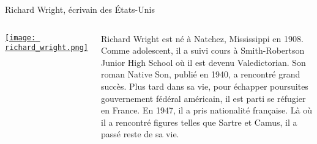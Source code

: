 \begin{frame}{Richard Wright, écrivain des États-Unis}
  \begin{columns}
      \begin{center}
        \href{https://www.ina.fr/ina-eclaire-actu/video/i05133764/richard-wright-a-propos-du-livre-fishbelly}{\texttt{[image: richard\_wright.png]}}
      \end{center}
      \small
      Richard Wright est né à Natchez, Mississippi en 1908.
      Comme adolescent, il a suivi \underline{} cours à Smith-Robertson Junior High School où il est devenu \underline{} Valedictorian.
      Son roman Native Son, publié en 1940, a rencontré \underline{} grand succès.
      Plus tard dans sa vie, pour échapper \underline{} poursuites \underline{} gouvernement fédéral américain, il est parti se réfugier en France.
      En 1947, il a pris \underline{} nationalité française.
      Là où il a rencontré \underline{} figures telles que Sartre et Camus, il a passé \underline{} reste de sa vie.
  \end{columns}
\end{frame}